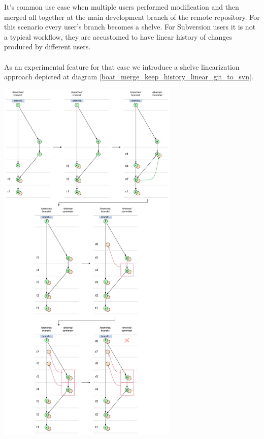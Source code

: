 It's common use case when multiple users performed modification and then merged all together at the main development branch of the remote repository. For this scenario every user's branch becomes a shelve. For Subversion users it is not a typical workflow, they are accustomed to have linear history of changes produced by different users.
\\\\
As an experimental feature for that case we introduce a shelve linearization approach depicted at diagram \ref{boat_merge_keep_history_linear_git_to_svn}.
\begin{center}
\includegraphics[height=18.0cm]{img/diagrams/ml_boat_merge_keep_history_linear_git_to_svn.pdf}%
\label{boat_merge_keep_history_linear_git_to_svn}%
\end{center}

